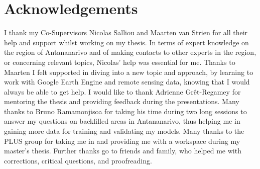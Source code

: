 \documentclass[11pt, A4, oneside]{report}
\begin{document}


\chapter*{Acknowledgements}
I thank my Co-Supervisors Nicolas Salliou and Maarten van Strien for all their help and support whilst working on my thesis. In terms of expert knowledge on the region of Antananarivo and of making contacts to other experts in the region, or concerning relevant topics, Nicolas' help was essential for me. Thanks to Maarten I felt supported in diving into a new topic and approach, by learning to work with Google Earth Engine and remote sensing data, knowing that I would always be able to get help. I would like to thank Adrienne
Grêt-Regamey for mentoring the thesis and providing feedback during the presentations. Many thanks to Bruno Ramamonjisoa for taking his time during two long sessions to answer my questions on backfilled areas in Antananarivo, thus helping me in gaining more data for training and validating my models.
Many thanks to the PLUS group for taking me in and providing me with a workspace during my master's thesis.
Further thanks go to friends and family, who helped me with corrections, critical questions, and proofreading.

\newpage
{}
\end{document}
